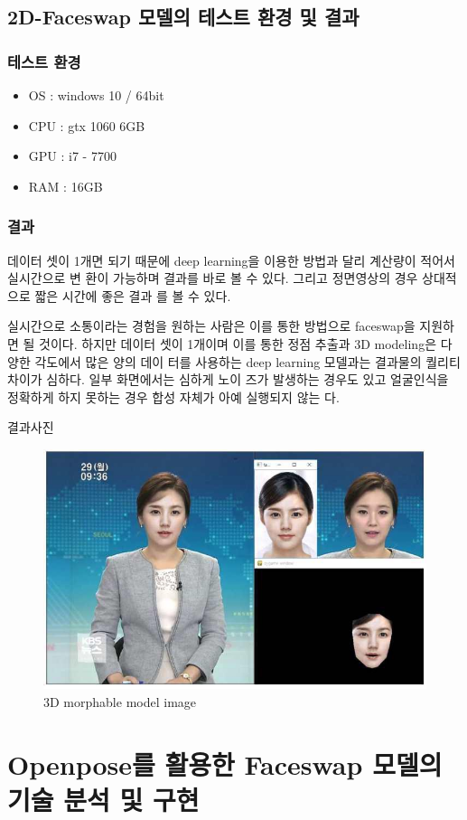 \documentclass{oblivoir}
\newcommand{\spec}{
    \begin{itemize}
        \item OS : windows 10 / 64bit
        \item CPU : gtx 1060 6GB
        \item GPU : i7 - 7700
        \item RAM : 16GB
    \end{itemize}
    }
\begin{document}
\section{2D-Faceswap 모델의 테스트 환경 및 결과}

\subsection{테스트 환경}
\spec
\subsection{결과}

데이터 셋이 1개면 되기 때문에 deep learning을 이용한 방법과 달리 계산량이 적어서 실시간으로 변 환이 가능하며 결과를 바로 볼 수 있다. 그리고 정면영상의 경우 상대적으로 짧은 시간에 좋은 결과 를 볼 수 있다.

실시간으로 소통이라는 경험을 원하는 사람은 이를 통한 방법으로 faceswap을 지원하면 될 것이다.  하지만 데이터 셋이 1개이며 이를 통한 정점 추출과 3D modeling은 다양한 각도에서 많은 양의 데이 터를 사용하는 deep learning 모델과는 결과물의 퀄리티 차이가 심하다. 일부 화면에서는 심하게 노이 즈가 발생하는 경우도 있고 얼굴인식을 정확하게 하지 못하는 경우 합성 자체가 아예 실행되지 않는 다.

결과사진 

\begin{figure}[h!]
  \centering
    \includegraphics{pic/chp2/img747}
  \caption{ 3D morphable model image\cite{reference7}}
\end{figure}



\chapter{Openpose를 활용한 Faceswap 모델의 기술 분석 및 구현}
\end{document}
